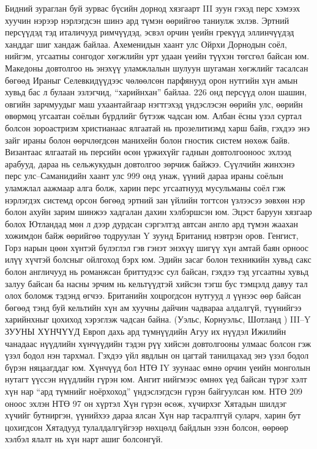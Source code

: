 Бидний зураглан буй зурвас бүсийн дорнод хязгаарт III зуун гэхэд перс хэмээх хуучин нэрээр нэрлэгдсэн шинэ ард түмэн өөрийгөө таниулж эхлэв. Эртний персүүдэд тэд италичууд римчүүдэд, эсвэл орчин үеийн грекүүд эллинчүүдэд ханддаг шиг хандаж байлаа. Ахеменидын хаант улс Ойрхи Дорнодын соёл, нийгэм, угсаатны сонгодог хөгжлийн урт удаан үеийн түүхэн төгсгөл байсан юм. Македоны довтолгоо нь энэхүү уламжлалын шулуун шугаман хөгжлийг тасалсан бөгөөд Ираныг Селевкидүүдээс чөлөөлсөн парфянууд орон нутгийн хүн амын хувьд бас л булаан эзлэгчид, “харийнхан” байлаа. 226 онд персүүд олон шашин, овгийн зарчмуудыг маш ухаантайгаар нэгтгэхэд үндэслэсэн өөрийн улс, өөрийн өвөрмөц угсаатан соёлын бүрдлийг бүтээж чадсан юм. Албан ёсны үзэл суртал болсон зороастризм христианаас ялгаатай нь прозелитизмд харш байв, гэхдээ энэ зайг ираны болон өөрчлөгдсөн манихейн болон гностик систем нөхөж байв. Византаас ялгаатай нь персийн өсөн үржихүйг гаднын довтолгооноос эхлээд арабууд, дараа нь сельжукудын довтолгоо зөрчиж байжээ. Сүүлчийн жинхэнэ перс улс–Саманидийн хаант улс 999 онд унаж, үүний дараа ираны соёлын уламжлал аажмаар алга болж, харин перс угсаатнууд мусульманы соёл гэж нэрлэгдэх системд орсон бөгөөд эртний зан үйлийн тогтсон үзлээсээ зөвхөн нэр болон ахуйн зарим шинжээ хадгалан дахин хэлбэршсэн юм.
Эцэст баруун хязгаар болох Ютландад мөн л дээр дурдсан сэргэлтэд автсан англо ард түмэн жаахан хожимдон байж өөрийгөө тодруулан Y зуунд Британид нэвтрэн оров. Генгист, Горз нарын цөөн хүнтэй бүлэглэл гэв гэнэт энэхүү шигүү хүн амтай баян орноос илүү хүчтэй болсныг ойлгоход бэрх юм. Эдийн засаг болон техникийн хувьд сакс болон англичууд нь романжсан бриттудээс сул байсан, гэхдээ тэд угсаатны хувьд залуу байсан ба насны эрчим нь кельтүүдтэй хийсэн тэгш бус тэмцэлд давуу тал олох боломж тэдэнд өгчээ. Британийн хоцрогдсон нутгууд л үүнээс өөр байсан бөгөөд тэнд буй кельтийн хүн ам хуучны дайчин чадвараа алдалгүй, түүнийгээ харийнхныг цохиход хэрэглэж чадсан байна. (Уэльс, Корнуэльс, Шотланд )
III–Y ЗУУНЫ ХҮНЧҮҮД
Европ дахь ард түмнүүдийн Агуу их нүүдэл Ижилийн чанадаас нүүдлийн хүнчүүдийн тэдэн рүү хийсэн довтолгооны улмаас болсон гэж үзэл бодол нэн тархмал. Гэхдээ үйл явдлын он цагтай танилцахад энэ үзэл бодол бүрэн няцаагддаг юм.
Хүнчүүд бол НТӨ IY зуунаас өмнө орчин үеийн монголын нутагт үүссэн нүүдлийн гүрэн юм. Ангит нийгмээс өмнөх үед байсан түрэг хэлт хүн нар “ард түмнийг ноёрхоход” үндэслэгдсэн гүрэн байгуулсан юм. НТӨ 209 оноос эхлэн НТӨ 97 он хүртэл Хүн гүрэн өсөж, хүчирхэг Хятадын шилдэг хүчийг бутниргэн, үүнийхээ дараа ялсан Хүн нар тасралтгүй суларч, харин бут цохигдсон Хятадууд тулалдалгүйгээр нөхцөлд байдлын эзэн болсон, өөрөөр хэлбэл ялалт нь хүн нарт ашиг болсонгүй.
